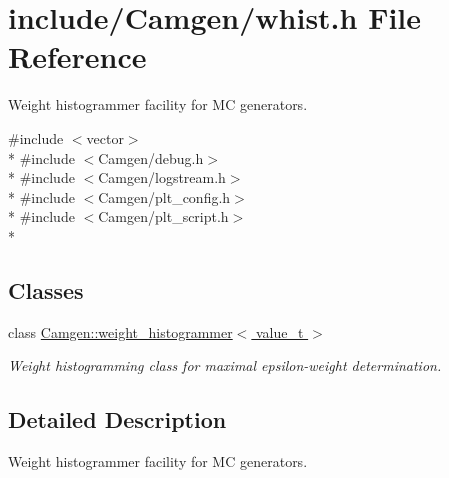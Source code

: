 \hypertarget{a00819}{\section{include/\-Camgen/whist.h File Reference}
\label{a00819}
}


Weight histogrammer facility for M\-C generators.  


{\ttfamily \#include $<$vector$>$}\\*
{\ttfamily \#include $<$Camgen/debug.\-h$>$}\\*
{\ttfamily \#include $<$Camgen/logstream.\-h$>$}\\*
{\ttfamily \#include $<$Camgen/plt\-\_\-config.\-h$>$}\\*
{\ttfamily \#include $<$Camgen/plt\-\_\-script.\-h$>$}\\*
\subsection*{Classes}
\begin{DoxyCompactItemize}
\item 
class \hyperlink{a00576}{Camgen\-::weight\-\_\-histogrammer$<$ value\-\_\-t $>$}
\begin{DoxyCompactList}\small\item\em Weight histogramming class for maximal epsilon-\/weight determination. \end{DoxyCompactList}\end{DoxyCompactItemize}


\subsection{Detailed Description}
Weight histogrammer facility for M\-C generators. 